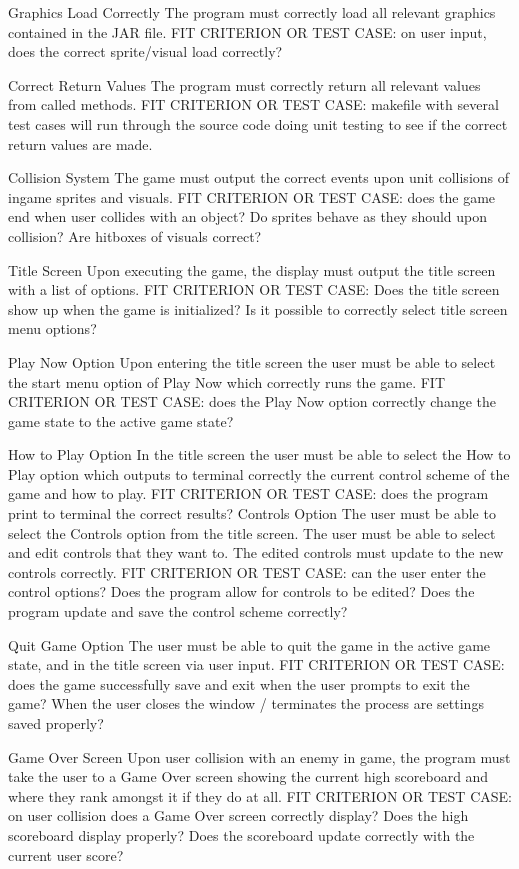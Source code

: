 \documentclass[12pt, titlepage]{article}
\begin{document}
Graphics Load Correctly
The program must correctly load all relevant graphics contained in the JAR file.
FIT CRITERION OR TEST CASE: on user input, does the correct sprite/visual load correctly?


Correct Return Values
The program must correctly return all relevant values from called methods.
FIT CRITERION OR TEST CASE: makefile with several test cases will run through the source code doing unit testing to see if the correct return values are made.


Collision System
The game must output the correct events upon unit collisions of ingame sprites and visuals.
FIT CRITERION OR TEST CASE: does the game end when user collides with an object? Do sprites behave as they should upon collision? Are hitboxes of visuals correct?


Title Screen 
Upon executing the game, the display must output the title screen with a list of options.
FIT CRITERION OR TEST CASE: Does the title screen show up when the game is initialized? Is it possible to correctly select title screen menu options?


Play Now Option
Upon entering the title screen the user must be able to select the start menu option of Play Now which correctly runs the game.
FIT CRITERION OR TEST CASE: does the Play Now option correctly change the game state to the active game state?


How to Play Option
In the title screen the user must be able to select the How to Play option which outputs to terminal correctly the current control scheme of the game and how to play.
FIT CRITERION OR TEST CASE: does the program print to terminal the correct results?
Controls Option
The user must be able to select the Controls option from the title screen. The user must be able to select and edit controls that they want to. The edited controls must update to the new controls correctly.
FIT CRITERION OR TEST CASE:  can the user enter the control options? Does the program allow for controls to be edited? Does the program update and save the control scheme correctly?


Quit Game Option
The user must be able to quit the game in the active game state, and in the title screen via user input. 
FIT CRITERION OR TEST CASE: does the game successfully save and exit when the user prompts to exit the game? When the user closes the window / terminates the process are settings saved properly?


Game Over Screen
Upon user collision with an enemy in game, the program must take the user to a Game Over screen showing the current high scoreboard and where they rank amongst it if they do at all.
FIT CRITERION OR TEST CASE: on user collision does a Game Over screen correctly display?  Does the high scoreboard display properly? Does the scoreboard update correctly with the current user score?
\end{document}
